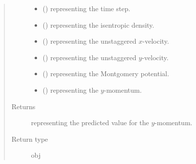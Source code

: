 \documentclass[letterpaper,10pt,english]{sphinxmanual}
\begin{document}
\begin{fulllineitems}
\begin{fulllineitems}
\begin{quote}
\begin{description}
\begin{itemize}
\item {} 
 () \textendash{}  representing the time step.

\item {} 
 () \textendash{}  representing the isentropic density.

\item {} 
 () \textendash{}  representing the unstaggered \(x\)-velocity.

\item {} 
 () \textendash{}  representing the unstaggered \(y\)-velocity.

\item {} 
 () \textendash{}  representing the Montgomery potential.

\item {} 
 () \textendash{}  representing the \(y\)-momentum.

\end{itemize}

\item[{Returns}] \leavevmode
{} representing the predicted value for the \(y\)-momentum.

\item[{Return type}] \leavevmode
obj

\end{description}\end{quote}

\end{fulllineitems}



\end{fulllineitems}
\end{document}

